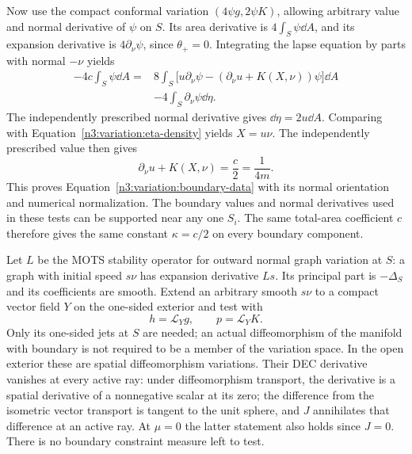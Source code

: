 Now use the compact conformal variation $(4\psi g,2\psi K)$,
allowing arbitrary value and normal derivative of $\psi$ on $S$.
Its area derivative is $4\int_S\psi\dd A$, and its expansion
derivative is $4\partial_\nu\psi$, since $\theta_+=0$.
Integrating the lapse equation by parts with normal $-\nu$ yields
\begin{equation}
 \begin{split}
 -4c\int_S\psi\dd A
    ={}&8\int_S\bigl[u\partial_\nu\psi
       -(\partial_\nu u+K(X,\nu))\psi\bigr]\dd A\\
      &-4\int_S\partial_\nu\psi\dd\eta.
 \end{split}
 \label{n3:variation:conformal-boundary}
\end{equation}
The independently prescribed normal derivative gives
$\dd\eta=2u\dd A$.  Comparing with
Equation~\eqref{n3:variation:eta-density} yields $X=u\nu$.
The independently prescribed value then gives
\[
 \partial_\nu u+K(X,\nu)=\frac c2=\frac1{4m}.
\]
This proves Equation~\eqref{n3:variation:boundary-data} with its
normal orientation and numerical normalization.  The boundary values
and normal derivatives used in these tests can be supported near any
one $S_i$.  The same total-area coefficient $c$ therefore gives the
same constant $\kappa=c/2$ on every boundary component.

Let $L$ be the MOTS stability operator for outward normal graph
variation at $S$: a graph with initial speed $s\nu$ has expansion
derivative $Ls$.  Its principal part is $-\Delta_S$ and its
coefficients are smooth.  Extend an arbitrary smooth $s\nu$ to
a compact vector field $Y$ on the one-sided exterior and test with
\[
 h=\mathcal L_Yg,\qquad p=\mathcal L_YK.
\]
Only its one-sided jets at $S$ are needed; an actual diffeomorphism
of the manifold with boundary is not required to be a member of
the variation space.  In the open exterior these are spatial
diffeomorphism variations.  Their DEC derivative vanishes at every
active ray: under diffeomorphism transport, the derivative is a
spatial derivative of a nonnegative scalar at its zero; the
difference from the isometric vector transport is tangent to the
unit sphere, and $J$ annihilates that difference at an active ray.
At $\mu=0$ the latter statement also holds since $J=0$.
There is no boundary constraint measure left to test.

